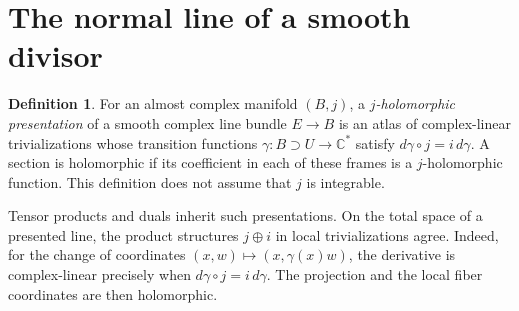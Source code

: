 \documentclass[11pt]{article}
\theoremstyle{definition}
\newtheorem{definition}[theorem]{Definition}
\theoremstyle{remark}
\newcommand{\C}{\mathbb C}
\begin{document}
\section{The normal line of a smooth divisor}\label{sec:normal}

\begin{definition}
For an almost complex manifold $(B,j)$, a \emph{$j$-holomorphic presentation} of a smooth complex line bundle $E\to B$ is an atlas of complex-linear trivializations whose transition functions $\gamma:B\supset U\to\C^*$ satisfy $d\gamma\circ j=i\,d\gamma$. A section is holomorphic if its coefficient in each of these frames is a $j$-holomorphic function. This definition does not assume that $j$ is integrable.
\end{definition}


Tensor products and duals inherit such presentations. On the total space of a presented line, the product structures $j\oplus i$ in local trivializations agree. Indeed, for the change of coordinates
$(x,w)\mapsto(x,\gamma(x)w)$, the derivative is complex-linear precisely when $d\gamma\circ j=i\,d\gamma$. The projection and the local fiber coordinates are then holomorphic.
\end{document}
